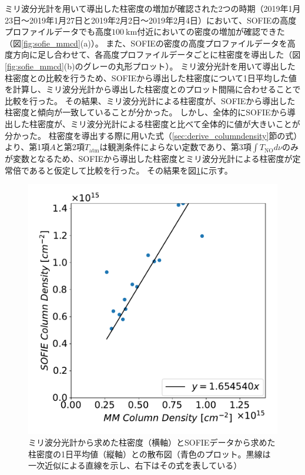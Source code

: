 ミリ波分光計を用いて導出した柱密度の増加が確認された2つの時期（2019年1月23日〜2019年1月27日と2019年2月2日〜2019年2月4日）において、SOFIEの高度プロファイルデータでも高度$100\ \mathrm{km}$付近においての密度の増加が確認できた（図\ref{fig:sofie_mmcd}(a)）。
また、SOFIEの密度の高度プロファイルデータを高度方向に足し合わせて、各高度プロファイルデータごとに柱密度を導出した（図\ref{fig:sofie_mmcd}(b)のグレーの丸形プロット）。
ミリ波分光計を用いて導出した柱密度との比較を行うため、SOFIEから導出した柱密度について1日平均した値を計算し、ミリ波分光計から導出した柱密度とのプロット間隔に合わせることで比較を行った。
その結果、ミリ波分光計による柱密度が、SOFIEから導出した柱密度と傾向が一致していることが分かった。
しかし、全体的にSOFIEから導出した柱密度が、ミリ波分光計による柱密度と比べて全体的に値が大きいことが分かった。
柱密度を導出する際に用いた式（\ref{sec:derive_columndensity}節の式）より、第1項$A$と第2項$T_{\mathrm{atm}}$は観測条件によらない定数であり、第3項$\int T_{\mathrm{NO}}d\nu$のみが変数となるため、SOFIEから導出した柱密度とミリ波分光計による柱密度が定常倍であると仮定して比較を行った。
その結果を図\ref{fig:sofie_mmcd_sofiecd_corr}に示す。
\begin{figure}[htbp]
    \centering
    \includegraphics[scale=0.5]{master_thesis_contents/master_thesis_fig/sofie_mmcd_sofiecd_corr.pdf}
    \caption{ミリ波分光計から求めた柱密度（横軸）とSOFIEデータから求めた柱密度の1日平均値（縦軸）との散布図（青色のプロット。黒線は一次近似による直線を示し、右下はその式を表している）}
    \label{fig:sofie_mmcd_sofiecd_corr}
\end{figure}
